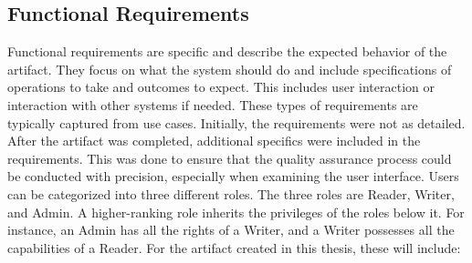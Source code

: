 \subsection{Functional Requirements}

Functional requirements are specific and describe the expected behavior of the artifact. 
They focus on what the system should do and include specifications of operations 
to take and outcomes to expect. 
This includes user interaction or interaction with other systems if needed. 
These types of requirements are typically captured from use cases. 
Initially, the requirements were not as detailed. 
After the artifact was completed, additional specifics were included in the requirements. 
This was done to ensure that the quality assurance process could be conducted with precision,
especially when examining the user interface. 
Users can be categorized into three different roles.
The three roles are Reader, Writer, and Admin. 
A higher-ranking role inherits the privileges of the roles below it. 
For instance, an Admin has all the rights of a Writer,
and a Writer possesses all the capabilities of a Reader.
For the artifact created in this thesis, these will include: 



